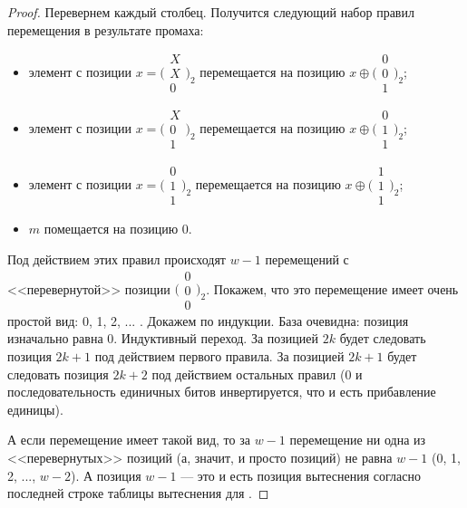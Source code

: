 \begin{proof}
Перевернем каждый столбец. Получится следующий набор правил перемещения в результате промаха:
\begin{itemize}
    \item элемент с позиции $x = \bigl(\begin{smallmatrix}X\\X\\0\end{smallmatrix}\bigr)_2$ перемещается на позицию $x \oplus \bigl(\begin{smallmatrix}0\\0\\1 \end{smallmatrix}\bigr)_2$;
    \item элемент с позиции $x = \bigl(\begin{smallmatrix}X\\0\\1\end{smallmatrix}\bigr)_2$ перемещается на позицию $x \oplus \bigl(\begin{smallmatrix}0\\1\\1\end{smallmatrix}\bigr)_2$;
    \item элемент с позиции $x = \bigl(\begin{smallmatrix}0\\1\\1\end{smallmatrix}\bigr)_2$ перемещается на позицию $x \oplus \bigl(\begin{smallmatrix}1\\1\\1\end{smallmatrix}\bigr)_2$;
    \item $m$ помещается на позицию 0.
\end{itemize}

Под действием этих правил происходят $w{-}1$ перемещений с <<перевернутой>> позиции $\bigl(\begin{smallmatrix}0\\0\\0\end{smallmatrix}\bigr)_2$. Покажем, что это перемещение имеет очень простой вид: 0, 1, 2, ... . Докажем по индукции. База очевидна: позиция изначально равна 0. Индуктивный переход. За позицией $2k$ будет следовать позиция $2k+1$ под действием первого правила. За позицией $2k+1$ будет следовать позиция $2k+2$ под действием остальных правил (0 и последовательность единичных битов инвертируется, что и есть прибавление единицы).

А если перемещение имеет такой вид, то за $w{-}1$ перемещение ни одна из <<перевернутых>> позиций (а, значит, и просто позиций) не равна $w{-}1$ (0, 1, 2, ..., $w{-}2$). А позиция $w{-}1$ --- это и есть позиция вытеснения согласно последней строке таблицы вытеснения для \PseudoLRU.
\end{proof}

